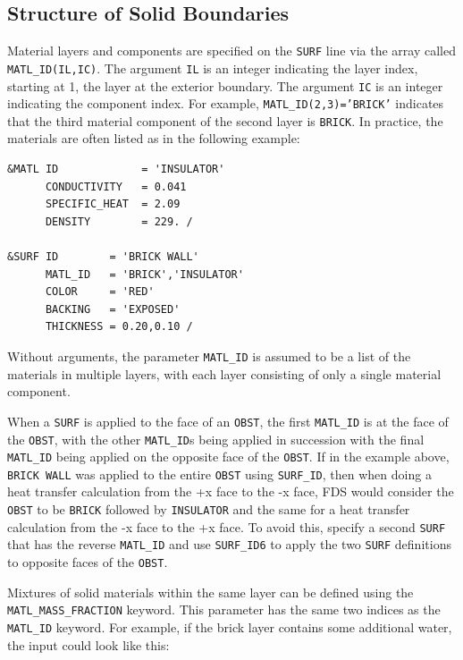 \documentclass[11pt]{book}
\newcommand{\ct}{\tt\small}
\begin{document}
\subsection{Structure of Solid Boundaries}

Material layers and components are
specified on the {\ct SURF} line via the array called {\ct MATL\_ID(IL,IC)}.
The argument {\ct IL} is an integer indicating the
layer index, starting at 1, the layer at the exterior boundary. The
argument {\ct IC} is an integer indicating the component index. For
example, {\ct MATL\_ID(2,3)='BRICK'} indicates that the third material
component of the second layer is {\ct BRICK}. In practice, the
materials are often listed as in the following example:

\footnotesize
\begin{verbatim}
&MATL ID             = 'INSULATOR'
      CONDUCTIVITY   = 0.041
      SPECIFIC_HEAT  = 2.09
      DENSITY        = 229. /

&SURF ID        = 'BRICK WALL'
      MATL_ID   = 'BRICK','INSULATOR'
      COLOR     = 'RED'
      BACKING   = 'EXPOSED'
      THICKNESS = 0.20,0.10 /

\end{verbatim}
\normalsize

\noindent
Without arguments, the parameter {\ct MATL\_ID} is assumed to be a list of the materials in multiple layers,
with each layer consisting of only a single
material component.

\begin{warning}
\noindent
When a {\ct SURF} is applied to the face of an {\ct OBST}, the first {\ct MATL\_ID} is at the face of the {\ct OBST}, with the
other {\ct MATL\_ID}s being applied in succession with the final {\ct MATL\_ID} being applied on the opposite face of the {\ct OBST}.
If in the example above, {\ct BRICK WALL} was applied to the entire {\ct OBST} using {\ct SURF\_ID}, then when doing a heat transfer calculation
from the +x face to the -x face, FDS would consider the {\ct OBST} to be {\ct BRICK} followed by {\ct INSULATOR} and the same for a heat transfer
calculation from the -x face to the +x face.  To avoid this, specify a second {\ct SURF} that has the reverse {\ct MATL\_ID}
and use {\ct SURF\_ID6} to apply the two {\ct SURF} definitions to opposite faces of the {\ct OBST}.
\end{warning}


\noindent Mixtures of solid materials within the same layer can be defined using
the {\ct MATL\_MASS\_FRACTION} keyword. This parameter has the same
two indices as the {\ct MATL\_ID} keyword. For example, if the
brick layer contains some additional water, the input could look like this:
\end{document}

